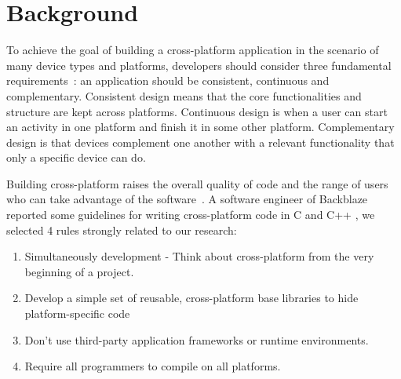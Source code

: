 \documentclass[10pt, conference]{IEEEtran}
\begin{document}

\section{Background}

To achieve the goal of building a cross-platform application in the scenario of many device types and platforms, developers should consider three fundamental requirements~\cite{Levin2014}: an application should be consistent, continuous and complementary. Consistent design means that the core functionalities and structure are kept across platforms. Continuous design is when a user can start an activity in one platform and finish it in some other platform. Complementary design is that devices complement one another with a relevant functionality that only a specific device can do.   



Building cross-platform raises the overall quality of code and the range of users who can take advantage of the software~\cite{backblaze2008}. A software engineer of Backblaze reported some guidelines for writing cross-platform code in C and C++ \cite{backblaze2008}, we selected 4 rules strongly related to our research:

\begin{enumerate}
\item Simultaneously development - Think about cross-platform from the very beginning of a project.  
\item Develop a simple set of reusable, cross-platform base libraries to hide platform-specific code
\item Don't use third-party application frameworks or runtime environments. 
\item Require all programmers to compile on all platforms.
\end{enumerate}
\end{document}
